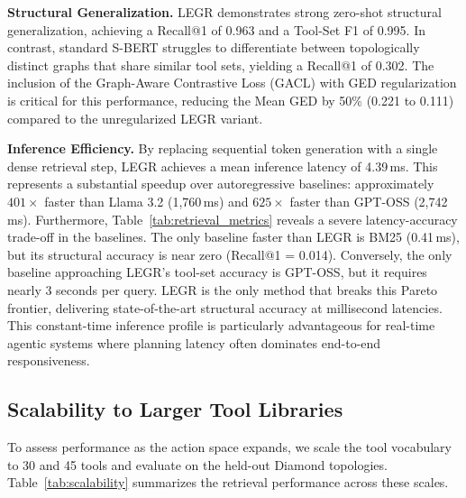 \documentclass{article}
\begin{document}
\textbf{Structural Generalization.} LEGR demonstrates strong zero-shot structural generalization, achieving a Recall@1 of 0.963 and a Tool-Set F1 of 0.995. In contrast, standard S-BERT struggles to differentiate between topologically distinct graphs that share similar tool sets, yielding a Recall@1 of 0.302. The inclusion of the Graph-Aware Contrastive Loss (GACL) with GED regularization is critical for this performance, reducing the Mean GED by 50\% (0.221 to 0.111) compared to the unregularized LEGR variant.

\textbf{Inference Efficiency.} By replacing sequential token generation with a single dense retrieval step, LEGR achieves a mean inference latency of 4.39\,ms. This represents a substantial speedup over autoregressive baselines: approximately $401\times$ faster than Llama 3.2 (1,760\,ms) and $625\times$ faster than GPT-OSS (2,742\,ms). Furthermore, Table~\ref{tab:retrieval_metrics} reveals a severe latency-accuracy trade-off in the baselines. The only baseline faster than LEGR is BM25 (0.41\,ms), but its structural accuracy is near zero (Recall@1 = 0.014). Conversely, the only baseline approaching LEGR's tool-set accuracy is GPT-OSS, but it requires nearly 3 seconds per query. LEGR is the only method that breaks this Pareto frontier, delivering state-of-the-art structural accuracy at millisecond latencies. This constant-time inference profile is particularly advantageous for real-time agentic systems where planning latency often dominates end-to-end responsiveness.

\subsection{Scalability to Larger Tool Libraries}
To assess performance as the action space expands, we scale the tool vocabulary to 30 and 45 tools and evaluate on the held-out Diamond topologies. Table~\ref{tab:scalability} summarizes the retrieval performance across these scales.
\end{document}
